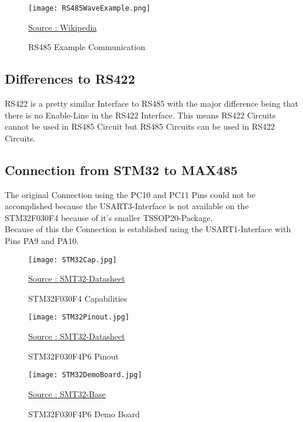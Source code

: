 \begin{figure}[!ht]
	\texttt{[image: RS485WaveExample.png]}
	\caption{RS485 Example Communication}
	\begin{center}
		\href{https://en.wikipedia.org/wiki/RS-485#Waveform_example}{Source : Wikipedia}
	\end{center}
	\label{fig:RS485ExampComm}
\end{figure}

\subsection{Differences to RS422}
\label{subsec:Diff422}

RS422 is a pretty similar Interface to RS485 with the major difference being that there is no Enable-Line in the RS422 Interface.
This means RS422 Circuits cannot be used in RS485 Circuit but RS485 Circuits can be used in RS422 Circuits.

\pagebreak

\subsection{Connection from STM32 to MAX485}
\label{subsec:RS_Conn}

The original Connection using the PC10 and PC11 Pins could not be accomplished because the USART3-Interface is not available on the STM32F030F4 because of it's smaller TSSOP20-Package.\\
Because of this the Connection is established using the USART1-Interface with Pins PA9 and PA10.

\begin{figure}[!ht]
	\texttt{[image: STM32Cap.jpg]}
	\caption{STM32F030F4 Capabilities}
	\begin{center}
		\href{https://www.st.com/resource/en/datasheet/stm32f030rc.pdf}{Source : SMT32-Datasheet}
	\end{center}
	\label{fig:PackageCap}
\end{figure}

\begin{figure}
	\texttt{[image: STM32Pinout.jpg]}
	\caption{STM32F030F4P6 Pinout}
	\begin{center}
		\href{https://www.st.com/resource/en/datasheet/stm32f030rc.pdf}{Source : SMT32-Datasheet}
	\end{center}
	\label{fig:STM32Pinout}
\end{figure}

\pagebreak

\begin{figure}[!ht]
	\texttt{[image: STM32DemoBoard.jpg]}
	\caption{STM32F030F4P6 Demo Board}
	\begin{center}
		\href{https://stm32-base.org/boards/STM32F030F4P6-STM32F030-DEMO-BOARD-V1.1}{Source : SMT32-Base}
	\end{center}
	\label{fig:DemoBoard}
\end{figure}

\pagebreak
